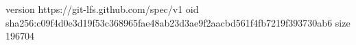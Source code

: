 version https://git-lfs.github.com/spec/v1
oid sha256:c09f4d0e3d19f53c368965fae48ab23d3ae9f2aacbd561f4fb7219f393730ab6
size 196704
